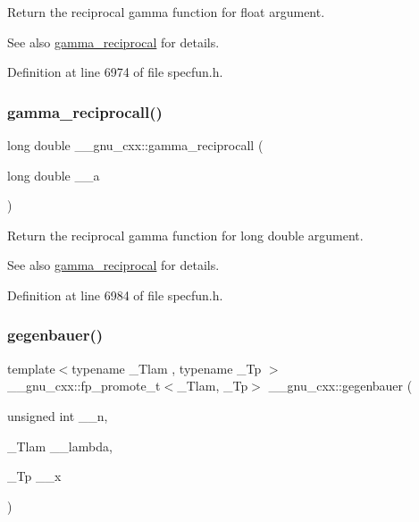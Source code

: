 Return the reciprocal gamma function for {\ttfamily  float } argument.

\begin{DoxySeeAlso}{See also}
\hyperlink{group__mathsf__gnu_ga641f9bcdb8fc32a9a0ce7a15b5040076}{gamma\+\_\+reciprocal} for details. 
\end{DoxySeeAlso}


Definition at line 6974 of file specfun.\+h.

\mbox{\label{group__mathsf__gnu_ga73bfcace13daa8b50e7e7e3f583a2eb0}} 
\subsubsection{\texorpdfstring{gamma\+\_\+reciprocall()}{gamma\_reciprocall()}}
{\footnotesize\ttfamily long double \+\_\+\+\_\+gnu\+\_\+cxx\+::gamma\+\_\+reciprocall (\begin{DoxyParamCaption}\item[{long double}]{\+\_\+\+\_\+a }\end{DoxyParamCaption})\hspace{0.3cm}{\ttfamily [inline]}}

Return the reciprocal gamma function for {\ttfamily  long double } argument.

\begin{DoxySeeAlso}{See also}
\hyperlink{group__mathsf__gnu_ga641f9bcdb8fc32a9a0ce7a15b5040076}{gamma\+\_\+reciprocal} for details. 
\end{DoxySeeAlso}


Definition at line 6984 of file specfun.\+h.

\mbox{\label{group__mathsf__gnu_ga512e7981e328d6184f604de1892048b6}} 
\subsubsection{\texorpdfstring{gegenbauer()}{gegenbauer()}}
{\footnotesize\ttfamily template$<$typename \+\_\+\+Tlam , typename \+\_\+\+Tp $>$ \\
\+\_\+\+\_\+gnu\+\_\+cxx\+::fp\+\_\+promote\+\_\+t$<$\+\_\+\+Tlam, \+\_\+\+Tp$>$ \+\_\+\+\_\+gnu\+\_\+cxx\+::gegenbauer (\begin{DoxyParamCaption}\item[{unsigned int}]{\+\_\+\+\_\+n,  }\item[{\+\_\+\+Tlam}]{\+\_\+\+\_\+lambda,  }\item[{\+\_\+\+Tp}]{\+\_\+\+\_\+x }\end{DoxyParamCaption})\hspace{0.3cm}{\ttfamily [inline]}}

